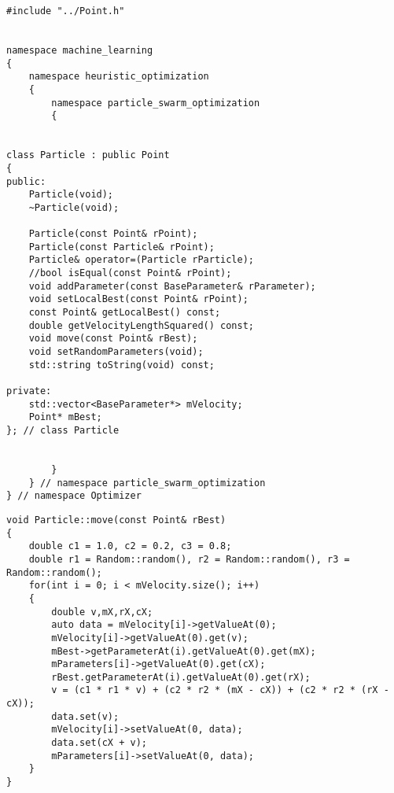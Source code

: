 \begin{lstlisting}
#include "../Point.h"


namespace machine_learning
{
	namespace heuristic_optimization
	{
		namespace particle_swarm_optimization
		{


class Particle : public Point
{
public:
    Particle(void);
    ~Particle(void);

    Particle(const Point& rPoint);
    Particle(const Particle& rPoint);
    Particle& operator=(Particle rParticle);
    //bool isEqual(const Point& rPoint);
    void addParameter(const BaseParameter& rParameter);
    void setLocalBest(const Point& rPoint);
    const Point& getLocalBest() const;
    double getVelocityLengthSquared() const;
    void move(const Point& rBest);
    void setRandomParameters(void);
    std::string toString(void) const;

private:
    std::vector<BaseParameter*> mVelocity;
    Point* mBest;
}; // class Particle


		}
	} // namespace particle_swarm_optimization
} // namespace Optimizer
\end{lstlisting}





\begin{lstlisting}
void Particle::move(const Point& rBest)
{
    double c1 = 1.0, c2 = 0.2, c3 = 0.8;
    double r1 = Random::random(), r2 = Random::random(), r3 = Random::random();
    for(int i = 0; i < mVelocity.size(); i++)
    {
        double v,mX,rX,cX;
        auto data = mVelocity[i]->getValueAt(0);
        mVelocity[i]->getValueAt(0).get(v);
        mBest->getParameterAt(i).getValueAt(0).get(mX);
        mParameters[i]->getValueAt(0).get(cX);
        rBest.getParameterAt(i).getValueAt(0).get(rX);
        v = (c1 * r1 * v) + (c2 * r2 * (mX - cX)) + (c2 * r2 * (rX - cX));
        data.set(v);
        mVelocity[i]->setValueAt(0, data);
        data.set(cX + v);
        mParameters[i]->setValueAt(0, data);
    }
}
\end{lstlisting}